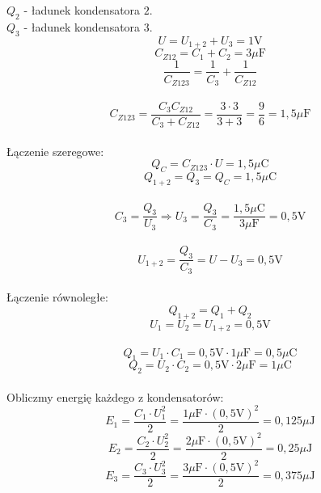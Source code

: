 \documentclass[14pt, table]{extarticle}
\newcommand{\farrad}{\textrm{F}}
\newcommand{\wolt}{\textrm{V}}
\newcommand{\kulomb}{\textrm{C}}
\begin{document}
$Q_2$ - ładunek kondensatora $2$. \\

$Q_3$ - ładunek kondensatora $3$. \\

\newpage
$$ U = U_{1+2} + U_3 = 1 \wolt $$ 
$$ C_{Z12} = C_1 + C_2 = 3 \mu\farrad $$ 
$$ \frac{1}{C_{Z123}} = \frac{1}{C_3} + \frac{1}{C_{Z12}} $$ \\ 
$$ C_{Z123} = \frac{C_3C_{Z12}}{C_3 + C_{Z12}} = \frac{3 \cdot 3}{3 + 3} = \frac{9}{6} = 1,5 \mu\farrad $$ \\ 
Łączenie szeregowe:
$$ Q_C = C_{Z123} \cdot U = 1,5 \mu\kulomb $$
$$ Q_{1+2} = Q_3 = Q_C = 1,5 \mu\kulomb $$ \\
$$ C_3 = \frac{Q_3}{U_3} \Rightarrow U_3 = \frac{Q_3}{C_3} = \frac{1,5 \mu\kulomb}{3 \mu\farrad} = 0,5 \wolt $$ \\
$$ U_{1+2} = \frac{Q_3}{C_3} = U - U_3 = 0,5 \wolt $$ \\
Łączenie równoległe:
$$ Q_{1+2} = Q_1 + Q_2 $$
$$ U_1 = U_2 = U_{1+2} = 0,5 \wolt$$ \\
$$ Q_1 = U_1 \cdot C_1 = 0,5 \wolt \cdot 1 \mu\farrad = 0,5 \mu\kulomb $$
$$ Q_2 = U_2 \cdot C_2 = 0,5 \wolt \cdot 2 \mu\farrad = 1 \mu\kulomb $$ \\
Obliczmy energię każdego z kondensatorów:
$$ E_1 = \frac{C_1 \cdot U_1^2}{2} = \frac{1 \mu\farrad \cdot \left(0,5 \wolt \right)^2}{2} = 0,125 \mu \textrm{J} $$ 
$$ E_2 = \frac{C_2 \cdot U_2^2}{2} = \frac{2 \mu\farrad \cdot \left(0,5 \wolt \right)^2}{2} = 0,25 \mu \textrm{J} $$ 
$$ E_3 = \frac{C_3 \cdot U_3^2}{2} = \frac{3 \mu\farrad \cdot \left(0,5 \wolt \right)^2}{2} = 0,375 \mu \textrm{J} $$ 
\end{document}
